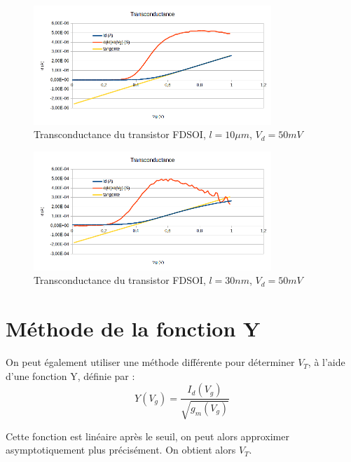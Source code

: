 \documentclass[a4paper,11pt]{report}
\begin{document}
\begin{figure}[h]
    \begin{center}
        \includegraphics[width=0.8\textwidth]{Images/FD1-10-Transconductance}
        \caption{Transconductance du transistor FDSOI, $l=10\mu m$, $V_d = 50mV$}
        \label{transc_fdsoi_10um}
    \end{center}
\end{figure}
\begin{figure}[h]
    \begin{center}
        \includegraphics[width=0.8\textwidth]{Images/FD11-30-Transconductance}
        \caption{Transconductance du transistor FDSOI, $l=30nm$, $V_d = 50mV$}
        \label{transc_fdsoi_30nm}
    \end{center}
\end{figure}



\section{Méthode de la fonction Y}
On peut également utiliser une méthode différente pour déterminer $V_T$, à l'aide d'une fonction Y, définie par :
\[Y(V_g)=\dfrac{I_d(V_g)}{\sqrt{g_m(V_g)}}\]

Cette fonction est linéaire après le seuil, on peut alors approximer asymptotiquement plus précisément. On obtient alors $V_T$.
\end{document}
